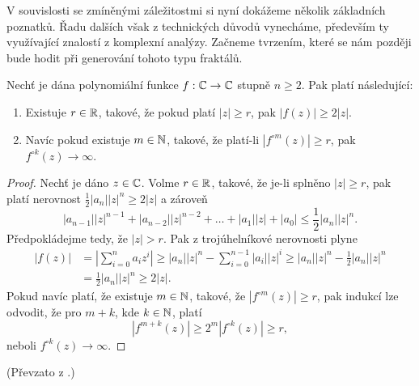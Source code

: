 V souvislosti se zmíněnými záležitostmi si nyní dokážeme několik základních poznatků. Řadu dalších však z technických důvodů vynecháme, především ty využívající znalostí z komplexní analýzy. Začneme tvrzením, které se nám později bude hodit při generování tohoto typu fraktálů.
\begin{lemma}\label{lem:test-konvergence-komplexniho-polynomu}
    Nechť je dána polynomiální funkce $f:\mathbb{C} \rightarrow \mathbb{C}$ stupně $n\geqslant 2$. Pak platí následující:
    \begin{enumerate}[label=(\roman*)]
        \item Existuje $r\in\mathbb{R}$, takové, že pokud platí $|z|\geqslant r$, pak $|f(z)|\geqslant2|z|$.
        \item Navíc pokud existuje $m\in\mathbb{N}$, takové, že platí-li $|f^{\circ m}(z)|\geqslant r$, pak $f^{\circ k}(z)\to\infty$.
    \end{enumerate} 
\end{lemma}
\begin{proof}
    Nechť je dáno $z\in\mathbb{C}$. Volme $r\in\mathbb{R}$, takové, že je-li splněno $|z|\geqslant r$, pak platí nerovnost $\frac{1}{2}|a_n||z|^n\geqslant 2|z|$ a zároveň
    \[|a_{n-1}||z|^{n-1}+|a_{n-2}||z|^{n-2}+\dots+|a_1||z|+|a_0|\leqslant\frac{1}{2}|a_n||z|^n.\]
    Předpokládejme tedy, že $|z|>r$. Pak z trojúhelníkové nerovnosti plyne
    \begin{align*}
        |f(z)|&=\left|\sum_{i=0}^{n}a_iz^i\right|\geqslant|a_n||z|^n-\sum_{i=0}^{n-1}|a_i||z|^i\geqslant|a_n||z|^n-\frac{1}{2}|a_n||z|^n\\
        &=\frac{1}{2}|a_n||z|^n\geqslant2|z|.
    \end{align*}
    Pokud navíc platí, že existuje $m\in\mathbb{N}$, takové, že $|f^{\circ m}(z)|\geqslant r$, pak indukcí lze odvodit, že pro $m+k$, kde $k\in\mathbb{N}$, platí
    \[|f^{m+k}(z)|\geqslant2^m|f^{\circ k}(z)|\geqslant r,\]
    neboli $f^{\circ k}(z)\to\infty$.
\end{proof}
(Převzato z \cite[str. 237]{Falconer1989}.)

